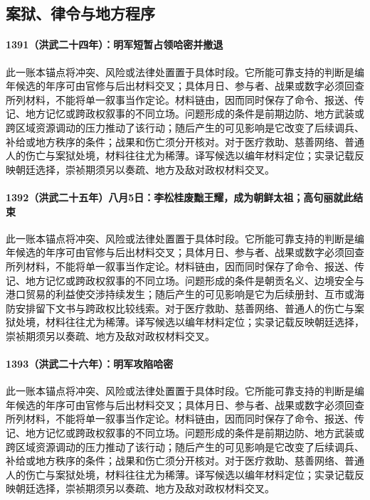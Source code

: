 \subsection{案狱、律令与地方程序}

\paragraph{1391（洪武二十四年）：明军短暂占领哈密并撤退} 此一账本锚点将冲突、风险或法律处置置于具体时段。它所能可靠支持的判断是编年候选的年序可由官修与后出材料交叉；具体月日、参与者、战果或数字必须回查所列材料，不能将单一叙事当作定论。材料链由，因而同时保存了命令、报送、传记、地方记忆或跨政权叙事的不同立场。问题形成的条件是前期边防、地方武装或跨区域资源调动的压力推动了该行动；随后产生的可见影响是它改变了后续调兵、补给或地方秩序的条件；战果和伤亡须分开核对。对于医疗救助、慈善网络、普通人的伤亡与案狱处境，材料往往尤为稀薄。译写候选以编年材料定位；实录记载反映朝廷选择，崇祯期须另以奏疏、地方及敌对政权材料交叉。

\paragraph{1392（洪武二十五年）八月5日：李松桂废黜王耀，成为朝鲜太祖；高句丽就此结束} 此一账本锚点将冲突、风险或法律处置置于具体时段。它所能可靠支持的判断是编年候选的年序可由官修与后出材料交叉；具体月日、参与者、战果或数字必须回查所列材料，不能将单一叙事当作定论。材料链由，因而同时保存了命令、报送、传记、地方记忆或跨政权叙事的不同立场。问题形成的条件是朝贡名义、边境安全与港口贸易的利益使交涉持续发生；随后产生的可见影响是它为后续册封、互市或海防安排留下文书与跨政权比较线索。对于医疗救助、慈善网络、普通人的伤亡与案狱处境，材料往往尤为稀薄。译写候选以编年材料定位；实录记载反映朝廷选择，崇祯期须另以奏疏、地方及敌对政权材料交叉。

\paragraph{1393（洪武二十六年）：明军攻陷哈密} 此一账本锚点将冲突、风险或法律处置置于具体时段。它所能可靠支持的判断是编年候选的年序可由官修与后出材料交叉；具体月日、参与者、战果或数字必须回查所列材料，不能将单一叙事当作定论。材料链由，因而同时保存了命令、报送、传记、地方记忆或跨政权叙事的不同立场。问题形成的条件是前期边防、地方武装或跨区域资源调动的压力推动了该行动；随后产生的可见影响是它改变了后续调兵、补给或地方秩序的条件；战果和伤亡须分开核对。对于医疗救助、慈善网络、普通人的伤亡与案狱处境，材料往往尤为稀薄。译写候选以编年材料定位；实录记载反映朝廷选择，崇祯期须另以奏疏、地方及敌对政权材料交叉。

